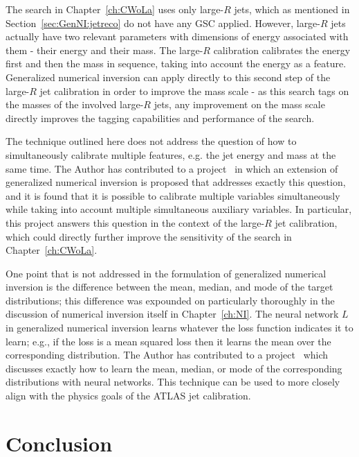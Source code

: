 The search in Chapter~\ref{ch:CWoLa} uses only large-$R$ jets, which as mentioned in Section~\ref{sec:GenNI:jetreco} do not have any GSC applied.
However, large-$R$ jets actually have two relevant parameters with dimensions of energy associated with them - their energy and their mass.
The large-$R$ calibration calibrates the energy first and then the mass in sequence, taking into account the energy as a feature.
Generalized numerical inversion can apply directly to this second step of the large-$R$ jet calibration in order to improve the mass scale - as this search tags on the masses of the involved large-$R$ jets, any improvement on the mass scale directly improves the tagging capabilities and performance of the search.

The technique outlined here does not address the question of how to simultaneously calibrate multiple features, e.g. the jet energy and mass at the same time.
The Author has contributed to a project~\cite{ATL-PHYS-PUB-2020-001} in which an extension of generalized numerical inversion is proposed that addresses exactly this question, and it is found that it is possible to calibrate multiple variables simultaneously while taking into account multiple simultaneous auxiliary variables.
In particular, this project answers this question in the context of the large-$R$ jet calibration, which could directly further improve the sensitivity of the search in Chapter~\ref{ch:CWoLa}.

One point that is not addressed in the formulation of generalized numerical inversion is the difference between the mean, median, and mode of the target distributions; this difference was expounded on particularly thoroughly in the discussion of numerical inversion itself in Chapter~\ref{ch:NI}.
The neural network $L$ in generalized numerical inversion learns whatever the loss function indicates it to learn; e.g., if the loss is a mean squared loss then it learns the mean over the corresponding distribution.
The Author has contributed to a project~\cite{Cheong:2019upg} which discusses exactly how to learn the mean, median, or mode of the corresponding distributions with neural networks.
This technique can be used to more closely align with the physics goals of the ATLAS jet calibration.

\section{Conclusion}
\label{sec:GenNI:conclusion}

